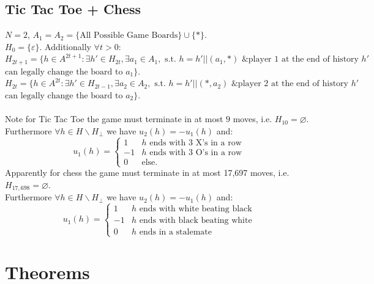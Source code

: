\documentclass[11pt]{article}
\theoremstyle{definition}
\theoremstyle{plain}
\begin{document}
\subsection*{Tic Tac Toe + Chess}
$N=2$, $A_1=A_2=\{\text{All Possible Game Boards}\} \cup \{*\}$.
\\
$H_0=\{\varepsilon\}$. Additionally $\forall t>0$:
\\
$H_{2t+1}=\{h \in A^{2t+1} : \exists h' \in H_{2t}, \exists a_1 \in A_1, \text{ s.t. } h=h'||(a_1,*) \text{ \& player 1 at the end of history } h'$
$\text{can legally change the board to } a_1\}.$ 
\\
$H_{2t}=\{h \in A^{2t} : \exists h' \in H_{2t-1}, \exists a_2 \in A_2, \text{ s.t. } h=h'||(*,a_2) \text{ \& player 2 at the end of history } h'$
$\text{can legally change the board to } a_2\}.$
\\
\\
Note for Tic Tac Toe the game must terminate in at most $9$ moves, i.e. $H_{10}=\varnothing$. 
\\
Furthermore $\forall h \in H \backslash H_{\bot}$ we have $u_2(h)=-u_1(h)$ and:
$$u_1(h)=\begin{cases}1 & h \text{ ends with 3 X's in a row} \\ -1 & h \text{ ends with 3 O's in a row} \\ 0 & \text{else}.\end{cases}$$
Apparently for chess the game must terminate in at most 17,697 moves, i.e. $H_{17,698}=\varnothing$.
\\
Furthermore $\forall h \in H \backslash H_{\bot}$ we have $u_2(h)=-u_1(h)$ and:
$$u_1(h)=\begin{cases}1 & h \text{ ends with white beating black} \\ -1 & h \text{ ends with black beating white} \\ 0 & \text{$h$ ends in a stalemate}\end{cases}$$


\section{Theorems}
\end{document}
